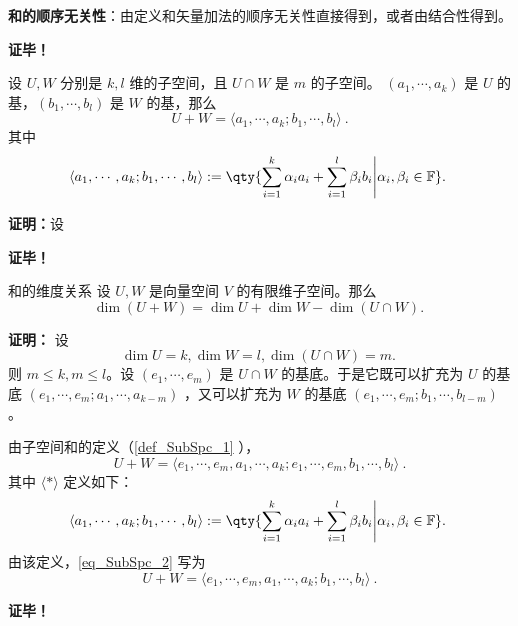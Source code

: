 \textbf{和的顺序无关性}：由定义和矢量加法的顺序无关性直接得到，或者由结合性得到。

\textbf{证毕！}

\begin{lemma}{}
设 $U,W$ 分别是 $k,l$ 维的子空间，且 $U\cap W$ 是 $m$ 的子空间。 $(a_1,\cdots,a_k)$ 是 $U$ 的基，$(b_1,\cdots,b_l)$ 是 $W$ 的基，那么
\begin{equation}
U+W=\langle a_1,\cdots,a_k;b_1,\cdots,b_l\rangle~.
\end{equation}
其中
\begin{equation}
\langle a_1,\cdots,a_k;b_1,\cdots,b_l\rangle:=\qty{\sum_{i=1}^k\alpha_i a_i+\sum_{i=1}^l\beta_i b_i\Bigg|\alpha_i,\beta_i\in \mathbb F}.~
\end{equation}
\end{lemma}

\textbf{证明：}设 


\textbf{证毕！}


\begin{theorem}{和的维度关系}
设 $U,W$ 是向量空间 $V$ 的有限维子空间。那么
\begin{equation}
\dim (U+W)=\dim U+\dim W-\dim(U\cap W).~
\end{equation}

\end{theorem}

\textbf{证明：}
设
\begin{equation}
\dim U=k,\dim W=l,\dim(U\cap W)=m.~
\end{equation}
则 $m\leq k,m\leq l$。设 $(e_1,\cdots,e_m)$ 是 $U\cap W$ 的基底。于是它既可以扩充为 $U$ 的基底 $(e_1,\cdots,e_m;a_1,\cdots,a_{k-m})$ ，又可以扩充为 $W$ 的基底 $(e_1,\cdots,e_m;b_1,\cdots,b_{l-m})$。

由子空间和的定义（\autoref{def_SubSpc_1} ），
\begin{equation}\label{eq_SubSpc_2}
U+W=\langle e_1,\cdots,e_m,a_1,\cdots,a_k;e_1,\cdots,e_m,b_1,\cdots,b_l\rangle~.
\end{equation}
其中 $\langle*\rangle$ 定义如下：
\begin{equation}
\langle a_1,\cdots,a_k;b_1,\cdots,b_l\rangle:=\qty{\sum_{i=1}^k\alpha_i a_i+\sum_{i=1}^l\beta_i b_i\Bigg|\alpha_i,\beta_i\in \mathbb F}.~
\end{equation}
由该定义，\autoref{eq_SubSpc_2} 写为
\begin{equation}
U+W=\langle e_1,\cdots,e_m,a_1,\cdots,a_k;b_1,\cdots,b_l\rangle~.
\end{equation}



\textbf{证毕！}




